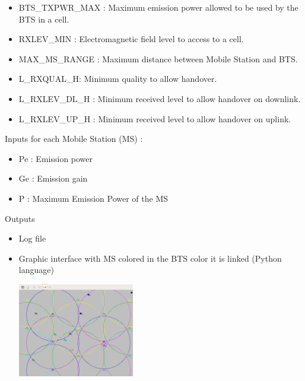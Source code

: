 \documentclass{beamer}
\begin{document}
\begin{frame}
\begin{itemize}
  \item BTS\_TXPWR\_MAX : Maximum emission power allowed to be used by the BTS in a cell.
  \item RXLEV\_MIN : Electromagnetic field level to access to a cell.
  \item MAX\_MS\_RANGE : Maximum distance between Mobile Station and BTS.
  \item L\_RXQUAL\_H: Minimum quality to allow handover.
  \item L\_RXLEV\_DL\_H : Minimum received level to allow handover on downlink.
  \item L\_RXLEV\_UP\_H : Minimum received level to allow handover on uplink.
\end{itemize}

\end{frame}

\begin{frame}
Inputs for each Mobile Station (MS) :
\begin{itemize}
  \item Pe : Emission power
  \item Ge : Emission gain
  \item P : Maximum Emission Power of the MS
\end{itemize}

\end{frame}

\begin{frame}
Outputs\\

\begin{itemize}
    \item Log file
    \item Graphic interface with MS colored in the BTS color it is linked
(Python language)
      \begin{center}
        \includegraphics[width=0.4\textwidth]{./images/capture.png}
      \end{center}
\end{itemize}

\end{frame}
\end{document}
